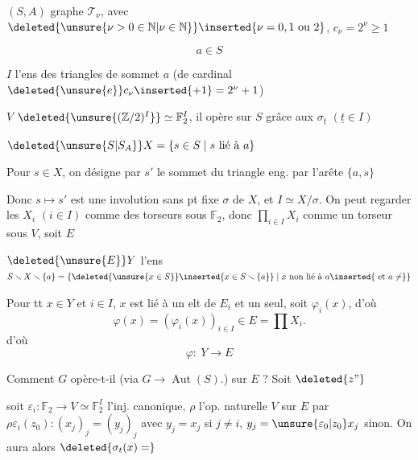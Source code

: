 \unsure{+)|*)} $(S,A)$ graphe  $\mathcal T_{\nu}$, avec $\deleted{\unsure{\nu>0\in\mathbb N|\nu\in\mathbb N}}\inserted{\nu=0,1\text{ ou }2}$, $c_\nu=2^\nu\geq1$

\[a\in S\]

$I$ l'ens des triangles de sommet $a$ (de cardinal $\deleted{\unsure{e}}c_\nu\inserted{+1}=2^\nu+1$)

$V$  $\deleted{\unsure{(\mathbb Z/2)^I}}\simeq\mathbb F_2^I$, il opère sur $S$ grâce aux $\sigma_{\underline t}$ $(\underline t\in I)$

$\deleted{\unsure{S|S_A}}X=\{s\in S\mid s\ \text{lié à }a\}$

 Pour $s\in X$, on désigne par $s'$ le  sommet du triangle eng. par l'arête $\{a,s\}$

Donc $s\mapsto s'$ est une involution sans pt fixe $\sigma$ de $X$, et $I\simeq X/\sigma$. On peut regarder les $X_i$ $(i\in I)$  comme des torseurs sous $\mathbb F_2$, donc $\prod_{i\in I}X_i$ comme un torseur sous $V$, soit $E$

 $\deleted{\unsure{E}}Y$ l'ens $S\smallsetminus X\smallsetminus\{a\}=\{\deleted{\unsure{x\in S}}\inserted{x\in S\smallsetminus\{a\}}\mid x\ \text{non lié à }a\inserted{\text{ et }a\ne}\}$

Pour tt $x\in Y$ et $i\in I$, $x$ est lié à un elt de $E_i$ et un seul, soit $\varphi_i(x)$, d'où
\[
\varphi(x)=(\varphi_i(x))_{i\in I}\in E=\prod X_i.
\]
d'où 
\[
\varphi:\ Y\longrightarrow E
\]

Comment $G$ opère-t-il (via $G\to\operatorname{Aut}(S)$.) sur $E$ ? Soit $\deleted{z\text{''}}$    

soit $\varepsilon_i:\mathbb F_2\longrightarrow V\simeq\mathbb F_2^I$  l'inj. canonique, $\rho$ l'op. naturelle  $V$ sur $E$ par $\rho\varepsilon_i(z_0):(x_j)_j=(y_j)_j$ avec $y_j=x_j$ si $j\ne i$, $y_j=\unsure{\varepsilon_0|z_0}x_j$ sinon. On aura alors $\deleted{\sigma_t(x)=}$
